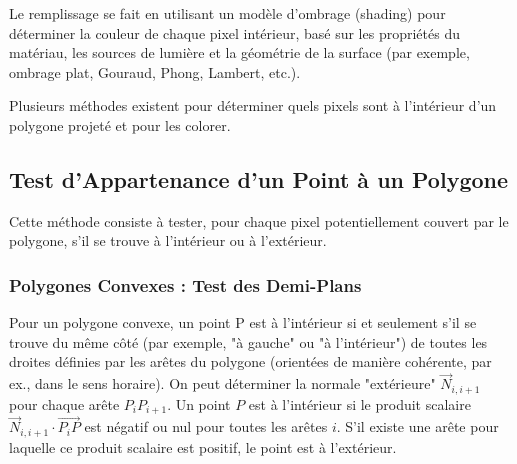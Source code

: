 \documentclass{article}
\begin{document}
Le remplissage se fait en utilisant un modèle d'ombrage (shading) pour déterminer la couleur de chaque pixel intérieur, basé sur les propriétés du matériau, les sources de lumière et la géométrie de la surface (par exemple, ombrage plat, Gouraud, Phong, Lambert, etc.).

Plusieurs méthodes existent pour déterminer quels pixels sont à l'intérieur d'un polygone projeté et pour les colorer.

\subsection{Test d'Appartenance d'un Point à un Polygone}

Cette méthode consiste à tester, pour chaque pixel potentiellement couvert par le polygone, s'il se trouve à l'intérieur ou à l'extérieur.

\subsubsection{Polygones Convexes : Test des Demi-Plans}
Pour un polygone convexe, un point P est à l'intérieur si et seulement s'il se trouve du même côté (par exemple, "à gauche" ou "à l'intérieur") de toutes les droites définies par les arêtes du polygone (orientées de manière cohérente, par ex., dans le sens horaire).
On peut déterminer la normale "extérieure" $\vec{N}_{i, i+1}$ pour chaque arête $P_i P_{i+1}$. Un point $P$ est à l'intérieur si le produit scalaire $\vec{N}_{i, i+1} \cdot \vec{P_i P}$ est négatif ou nul pour toutes les arêtes $i$. S'il existe une arête pour laquelle ce produit scalaire est positif, le point est à l'extérieur.
\end{document}
